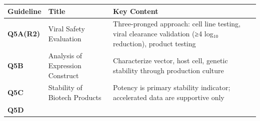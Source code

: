 \documentclass[
  11pt,
  a4paper,
]{report}
\begin{document}
\begin{longtable}[]{@{}lll@{}}
\toprule
\begin{minipage}[b]{0.32\columnwidth}\raggedright
Guideline\strut
\end{minipage} & \begin{minipage}[b]{0.21\columnwidth}\raggedright
Title\strut
\end{minipage} & \begin{minipage}[b]{0.38\columnwidth}\raggedright
Key Content\strut
\end{minipage}\tabularnewline
\midrule
\endhead
\begin{minipage}[t]{0.32\columnwidth}\raggedright
\textbf{Q5A(R2)}\strut
\end{minipage} & \begin{minipage}[t]{0.21\columnwidth}\raggedright
Viral Safety Evaluation\strut
\end{minipage} & \begin{minipage}[t]{0.38\columnwidth}\raggedright
Three-pronged approach: cell line testing, viral clearance validation
(≥4 log₁₀ reduction), product testing\strut
\end{minipage}\tabularnewline
\begin{minipage}[t]{0.32\columnwidth}\raggedright
\textbf{Q5B}\strut
\end{minipage} & \begin{minipage}[t]{0.21\columnwidth}\raggedright
Analysis of Expression Construct\strut
\end{minipage} & \begin{minipage}[t]{0.38\columnwidth}\raggedright
Characterize vector, host cell, genetic stability through production
culture\strut
\end{minipage}\tabularnewline
\begin{minipage}[t]{0.32\columnwidth}\raggedright
\textbf{Q5C}\strut
\end{minipage} & \begin{minipage}[t]{0.21\columnwidth}\raggedright
Stability of Biotech Products\strut
\end{minipage} & \begin{minipage}[t]{0.38\columnwidth}\raggedright
Potency is primary stability indicator; accelerated data are supportive
only\strut
\end{minipage}\tabularnewline
\begin{minipage}[t]{0.32\columnwidth}\raggedright
\textbf{Q5D}\strut
\end{minipage} & \begin{minipage}[t]{0.21\columnwidth}\raggedright

\end{minipage}
\end{longtable}
\end{document}
